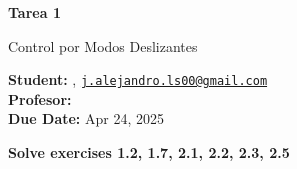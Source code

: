  





\begin{Large}
	\textbf{\textbf{Tarea 1}}

	Control por Modos Deslizantes
\end{Large}

\vspace{1ex}

\textbf{Student:} , \href{mailto:j.alejandro.ls00@gmail.com}{\texttt{j.alejandro.ls00@gmail.com}}\\
\textbf{Profesor:}  \\
\textbf{Due Date:} Apr 24, 2025 \\

\vspace{2ex}

\textbf{Solve exercises 1.2, 1.7, 2.1, 2.2, 2.3, 2.5}


\newpage

\newpage

\newpage

\newpage

\newpage

\newpage

\newpage


% 
% 

